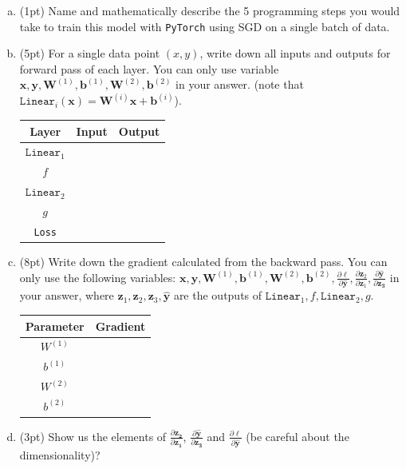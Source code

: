 \begin{enumerate}[(a)]
\item
(1pt) Name and mathematically describe the 5 programming steps you would take to train this model with \texttt{PyTorch} using SGD on a single batch of data.

\item
(5pt) For a single data point $(x, y)$, write down all inputs and outputs for forward pass of each layer. You can only use variable $ \bm{x}, \bm{y}, \bm{W}^{(1)}, \bm{b}^{(1)}, \bm{W}^{(2)}, \bm{b}^{(2)}$ in your answer. (note that $\texttt{Linear}_i (\bm{x}) = \bm{W}^{(i)}\bm{x} + \bm{b}^{(i)}$).


\begin{center}
\begin{tabular}{ |c |c |c | }
\hline
Layer & Input & Output \\
\hline
$\texttt{Linear}_1$ &  &  \\
\hline
$f$ &  &  \\  
\hline
$\texttt{Linear}_2$ & &  \\
\hline
$g$ &  &  \\
\hline
\texttt{Loss} &  &  \\
\hline
\end{tabular}
\end{center}


\item
(8pt) Write down the gradient calculated from the backward pass. You can only use the following variables: $\bm{x}, \bm{y}, \bm{W}^{(1)}, \bm{b}^{(1)}, \bm{W}^{(2)}, \bm{b}^{(2)}, \frac{\partial \ell}{\partial \bm{\hat y}}, \frac{\partial \bm{z}_2}{\partial \bm{z}_1}, \frac{\partial \bm{\hat y}}{\partial \bm{z_3}}$ in your answer, where $\bm{z}_1, \bm{z}_2, \bm{z}_3, \bm{\hat y}$ are the outputs of $\texttt{Linear}_1, f, \texttt{Linear}_2, g$.

\begin{center}
\begin{tabular}{ |c |c | }
\hline
Parameter &  Gradient \\
\hline
$W^{(1)}$ &\\
\hline
$b^{(1)}$ &  \\ 
\hline
$W^{(2)}$ &  \\
\hline
$b^{(2)}$ & \\
\hline
\end{tabular}
\end{center}

\item 
(3pt) Show us the elements of $\frac{\partial \bm{z_2}}{\partial \bm{z_1}}$, $\frac{\partial \bm{\hat y}}{\partial \bm{z_3}}$ and $\frac{\partial \ell}{\partial \bm{\hat y}}$ (be careful about the dimensionality)?

\end{enumerate}


